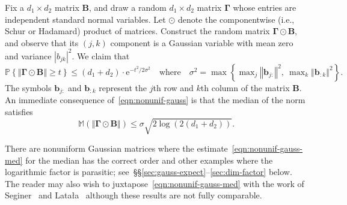 \documentclass[11pt,letterpaper,twoside,reqno,draft]{amsart}
\theoremstyle{remark}
\numberwithin{equation}{section}
\numberwithin{thm}{section}
\begin{document}
Fix a $d_1 \times d_2$ matrix ${\bm{{B}}}$, and draw a random $d_1 \times d_2$ matrix ${\bm{{\Gamma}}}$ whose entries are independent standard normal variables.
Let $\odot$ denote the componentwise (i.e., Schur or Hadamard) product of matrices.  Construct the random matrix ${\bm{{\Gamma}}} \odot {\bm{{B}}}$, and observe that its $(j, k)$ component is a Gaussian variable with mean zero and variance ${{{\left\vert {{{b_{jk}}}} \right\vert}}^2}$.  We claim that
\begin{equation} \label{eqn:nonunif-gauss}
{\mathbb{P}\left\{ {{ {\left\Vert {{ {\bm{{\Gamma}}} \odot {\bm{{B}}} }} \right\Vert} \geq t }} \right\}}
	\leq (d_1 + d_2) \cdot {\mathrm{e}}^{-t^2/2\sigma^2}
	\quad\text{where}\quad
	\sigma^2 = \max\left\{ \max\nolimits_j {{\left\Vert {{{{\bm{{b}}}_{j:}}}} \right\Vert}^2}, \
		\max\nolimits_k {{\left\Vert {{{{\bm{{b}}}_{:k}}}} \right\Vert}^2} \right\}.
\end{equation}
The symbols ${\bm{{b}}}_{j:}$ and ${\bm{{b}}}_{:k}$ represent the $j$th row and $k$th column of the matrix ${\bm{{B}}}$.  An immediate consequence of~\eqref{eqn:nonunif-gauss} is that the median of the norm satisfies
\begin{equation} \label{eqn:nonunif-gauss-med}
\mathbb{M}( {\left\Vert {{ {\bm{{\Gamma}}} \odot {\bm{{B}}} }} \right\Vert} ) \leq \sigma \sqrt{2\log( 2(d_1 + d_2))}.
\end{equation}

\noindent
There are nonuniform Gaussian matrices where the estimate~\eqref{eqn:nonunif-gauss-med} for the median has the correct order and other examples where the logarithmic factor is parasitic; see~\S\S\ref{sec:gauss-expect}--\ref{sec:dim-factor} below.
The reader may also wish to juxtapose~\eqref{eqn:nonunif-gauss-med} with the work of Seginer~\cite[Thm.~3.1]{Seg00:Expected-Norm} and Lata{\l}a~\cite[Thm.~1]{Lat05:Some-Estimates} although these results are not fully comparable.
\end{document}
